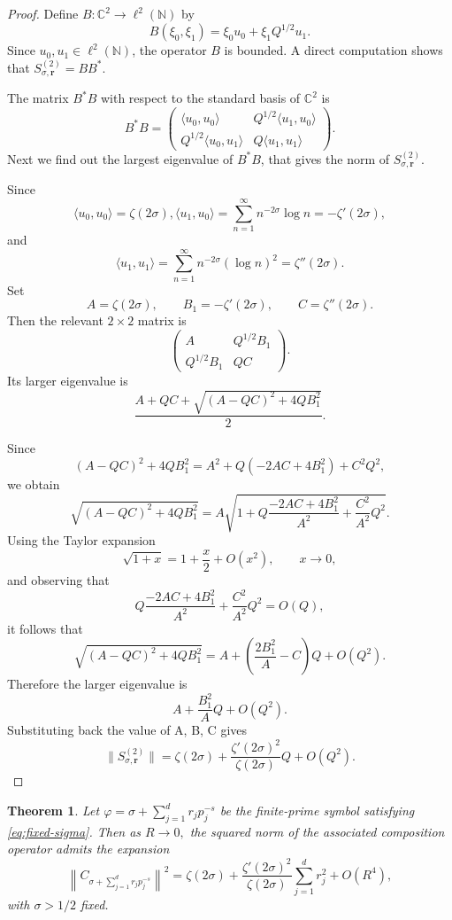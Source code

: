 \documentclass[12pt, reqno]{amsart}
\numberwithin{equation}{section}
\newtheorem{theorem}{Theorem}[section]
\begin{document}
\begin{proof}
Define $B:\mathbb{C}^{2}\to\ell^{2}(\mathbb{N})$ by
\[
B(\xi_0,\xi_1)=\xi_0u_0+\xi_1Q^{1/2}u_1.
\]
Since $u_0,u_1 \in \ell^2(\mathbb{N})$, the operator $B$ is bounded. A direct computation shows that
 $S_{\sigma,\boldsymbol{r}}^{(2)}=BB^{*}.$

The matrix  $B^*B$ with respect to  the standard basis of $\mathbb{C}^2$ is
\[
B^{*}B
=
\begin{pmatrix}
\langle u_0,u_0\rangle & Q^{1/2}\langle u_1,u_0\rangle\\
Q^{1/2}\langle u_0,u_1\rangle & Q\langle u_1,u_1\rangle
\end{pmatrix}.
\]
Next we find out the largest eigenvalue of $B^{*}B$, that gives the norm of $S_{\sigma,\boldsymbol{r}}^{(2)}$.

Since $$\langle u_0,u_0\rangle=\zeta(2\sigma),
\langle u_1,u_0\rangle
=
\sum_{n=1}^{\infty}n^{-2\sigma}\log n
=
-\zeta'(2\sigma),$$
and $$
\langle u_1,u_1\rangle
=
\sum_{n=1}^{\infty}n^{-2\sigma}(\log n)^2
=
\zeta''(2\sigma).
$$
Set
\[
A=\zeta(2\sigma),
\qquad
B_1=-\zeta'(2\sigma),
\qquad
C=\zeta''(2\sigma).
\]
Then the relevant \(2\times 2\) matrix is
\[
\begin{pmatrix}
A & Q^{1/2}B_1\\
Q^{1/2}B_1 & QC
\end{pmatrix}.
\]
Its larger eigenvalue is
\[
\frac{A+QC+\sqrt{(A-QC)^2+4QB_1^2}}{2}.
\]

Since
\[
(A-QC)^2+4QB_1^2
=
A^2+Q(-2AC+4B_1^2)+C^2Q^2,
\]
we obtain
\[
\sqrt{(A-QC)^2+4QB_1^2}
=
A\sqrt{1+
Q\frac{-2AC+4B_1^2}{A^2}
+\frac{C^2}{A^2}Q^2}.
\]
Using the Taylor expansion
\[
\sqrt{1+x}=1+\frac{x}{2}+O(x^2), \qquad x\to0,
\]
and observing that
\[
Q\frac{-2AC+4B_1^2}{A^2}+\frac{C^2}{A^2}Q^2=O(Q),
\]
it follows that
\[
\sqrt{(A-QC)^2+4QB_1^2}
=
A+
\left(
\frac{2B_1^2}{A}-C
\right)Q
+O(Q^2).
\]
Therefore the larger eigenvalue is
\[
A+\frac{B_1^2}{A}Q+O(Q^2).
\]
Substituting back the value of A, B, C gives
\[
\|S_{\sigma,\boldsymbol{r}}^{(2)}\|
=
\zeta(2\sigma)
+
\frac{\zeta'(2\sigma)^2}{\zeta(2\sigma)}Q
+
O(Q^2).
\]
\end{proof}

\begin{theorem}
\label{T:finite-prime-fixed-sigma-expansion}
Let $\varphi=\sigma+\sum_{j=1}^{d}r_jp_j^{-s}$ be the finite-prime symbol  satisfying  \eqref{eq:fixed-sigma}. Then as $R\to 0,$ the squared norm of the associated composition operator admits the expansion
\[
\left\|C_{\sigma+\sum_{j=1}^{d}r_jp_j^{-s}}\right\|^{2}
=
\zeta(2\sigma)
+
\frac{\zeta'(2\sigma)^2}{\zeta(2\sigma)}
\sum_{j=1}^{d}r_j^2
+
O(R^4),
\]
with $\sigma>1/2$ fixed.
\end{theorem}
\end{document}
